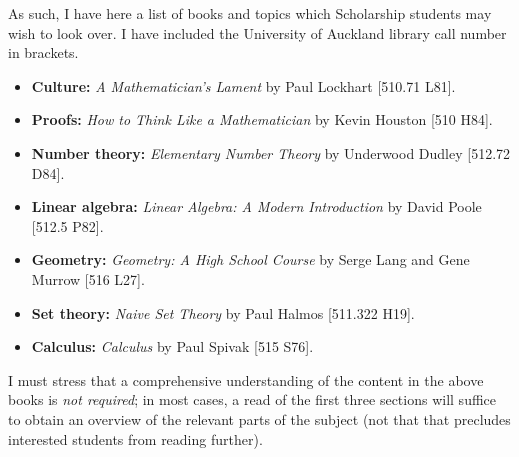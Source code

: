 \documentclass[a4paper,leqno]{article}
\numberwithin{equation}{section}
\theoremstyle{definition}
\theoremstyle{remark}
\begin{document}
As such, I have here a list of books and topics which Scholarship students may wish to look over. I have included the University of Auckland
library call number in brackets.
\begin{itemize}
  \item \textbf{Culture:} \emph{A Mathematician's Lament} by Paul Lockhart [510.71 L81].
  \item \textbf{Proofs:} \emph{How to Think Like a Mathematician} by Kevin Houston [510 H84].
  \item \textbf{Number theory:} \emph{Elementary Number Theory} by Underwood Dudley [512.72 D84].
  \item \textbf{Linear algebra:} \emph{Linear Algebra: A Modern Introduction} by David Poole [512.5 P82].
  \item \textbf{Geometry:} \emph{Geometry: A High School Course} by Serge Lang and Gene Murrow [516 L27].
  \item \textbf{Set theory:} \emph{Naive Set Theory} by Paul Halmos [511.322 H19].
  \item \textbf{Calculus:} \emph{Calculus} by Paul Spivak [515 S76].
\end{itemize}

I must stress that a comprehensive understanding of the content in the above books is \emph{not required}; in most cases, a read of the first three
sections will suffice to obtain an overview of the relevant parts of the subject (not that that precludes interested students from reading further).
\end{document}
